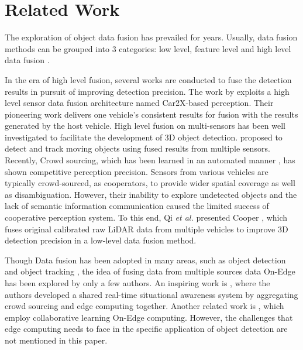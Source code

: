 \documentclass[sigconf]{acmart}
\begin{document}
\section{Related Work}

The exploration of object data fusion has prevailed for years. Usually, data fusion methods can be grouped into 3 categories: low level, feature level and high level data fusion \cite{shi2018leveraging}. 


In the era of high level fusion, several works are conducted to fuse the detection results in pursuit of improving detection precision. The work by \cite{rauch2012car2x} exploits a high level sensor data fusion architecture named Car2X-based perception. Their pioneering work delivers one vehicle's consistent results for fusion with the results generated by the host vehicle. High level fusion on multi-sensors has been well investigated to facilitate the development of 3D object detection. \cite{cho2014multi} proposed to detect and track moving objects using fused results from multiple sensors. Recently, Crowd sourcing, which has been learned in an automated manner \cite{qiu2018towards}, has shown competitive perception precision. Sensors from various vehicles are typically crowd-sourced, as cooperators, to provide wider spatial coverage as well as disambiguation.
However, their inability to explore undetected objects and the lack of semantic information communication caused the limited success of cooperative perception system. 
To this end, Qi \textit{et al.} presented Cooper \cite{qi2019cooper}, which fuses original calibrated raw LiDAR data from multiple vehicles to improve 3D detection precision in a low-level data fusion method. 




Though Data fusion has been adopted in many areas, such as object detection and object tracking \cite{luo2018fast}, the idea of fusing data from multiple sources data On-Edge has been explored by only a few authors. An inspiring work is \cite{satyanarayanan2017edge}, where the authors developed a shared real-time situational awareness system by aggregating crowd sourcing and edge computing together.  Another related work is \cite{collaborative}, which employ collaborative learning On-Edge computing. However, the challenges that edge computing needs to face in the specific application of object detection are not mentioned in this paper.
\end{document}
